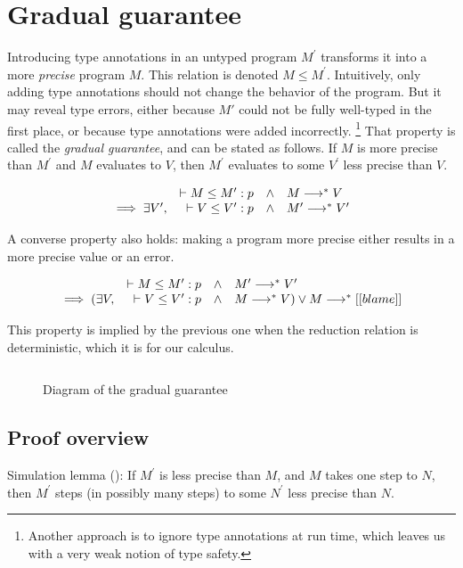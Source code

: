 \section{Gradual guarantee}

Introducing type annotations in an untyped program $M^\prime$ transforms it into a more \emph{precise} program $M$.
This relation is denoted $M \le M^\prime$.
Intuitively, only adding type annotations should not change the behavior of the program.
But it may reveal type errors, either because $M'$ could not be fully well-typed
in the first place, or because type annotations were added incorrectly.
\footnote{Another approach is to ignore type annotations at run time, which leaves us with a very weak notion of type safety.}
That property is called the \emph{gradual guarantee}, and can be stated as follows.
If $M$ is more precise than $M^\prime$ and $M$ evaluates to $V$,
then $M^\prime$ evaluates to some $V^\prime$ less precise than $V$.

\newcommand\wwedge{\quad\wedge\quad}

\[
\begin{array}{rrcl}
  & \vdash M \le M^\prime : p & \wedge & M \longrightarrow^\ast V
\\ \implies \exists V^\prime , & \vdash V \le V^\prime : p & \wedge & M^\prime \longrightarrow^\ast V^\prime
\end{array}
\]

A converse property also holds: making a program more precise either results in a more precise value
or an error.

\[
\begin{array}{rrcl}
  & \vdash M \le M^\prime : p & \wedge & M^\prime \longrightarrow^\ast V^\prime
  \\ \implies (\exists V , & \vdash V \le V^\prime : p & \wedge & M \longrightarrow^\ast V) \vee M \longrightarrow^\ast [[blame]]
\end{array}
\]

This property is implied by the previous one when the reduction relation is deterministic, which it is for our calculus.

\begin{figure}
$$

$$
\caption{Diagram of the gradual guarantee}
\label{fig:gg}
\end{figure}

\subsection{Proof overview}

Simulation lemma (): If $M^\prime$ is less precise than $M$, and $M$ takes one step to $N$,
then $M^\prime$ steps (in possibly many steps) to some $N^\prime$ less precise than $N$.

